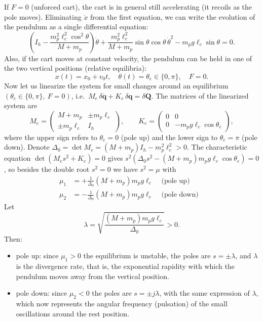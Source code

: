 \documentclass[10pt, a4paper]{report}
\begin{document}
If $F=0$ (unforced cart), the cart is in general still accelerating (it recoils as the pole moves). Eliminating $\ddot x$ from the first equation, we can write the evolution of the pendulum as a single differential equation:
\begin{equation}
    \left( I_h - \frac{m_p^2 \ell_c^2 \cos^2 \theta}{M + m_p} \right) \ddot{\theta} + \frac{m_p^2 \ell_c^2}{M + m_p} \sin \theta \cos \theta \, \dot{\theta}^2 - m_p g \ell_c \sin \theta = 0.
\end{equation}
Also, if the cart moves at constant velocity, the pendulum can be held in one of the two vertical positions (relative equilibria):
\begin{equation}
    x(t)=x_0+v_0t,\quad \theta(t)=\theta_e\in\{0,\pi\}, \quad F=0.
\end{equation}
Now let us linearize the system for small changes around an equilibrium $(\theta_e\in\{0,\pi\},\ F=0)$, i.e.\ $M_e\,\delta\ddot{\mathbf q}+K_e\,\delta\mathbf q=\delta\mathbf Q$. The matrices of the linearized system are
\begin{equation}
    M_e=\begin{pmatrix}
        M+m_p& \pm m_p\ell_c\\ \pm m_p\ell_c&I_h
    \end{pmatrix},\qquad K_e=\begin{pmatrix}
        0&0\\
        0&-m_pg\ell_c\cos\theta_e
    \end{pmatrix},
\end{equation}
where the upper sign refers to $\theta_e=0$ (pole up) and the lower sign to $\theta_e=\pi$ (pole down). Denote $\Delta_0=\det M_e=(M+m_p)I_h-m_p^2\ell_c^2>0$. The characteristic equation $\det(M_e s^2+K_e)=0$ gives $s^2\left(\Delta_0 s^2-(M+m_p)m_pg\ell_c\cos\theta_e\right)=0$, so besides the double root $s^2=0$ we have $s^2=\mu$ with
\begin{align}
    \mu_1&=+\frac{1}{\Delta_0}(M+m_p)m_pg\ell_c& \text{ (pole up)}&\\
    \mu_2&=-\frac{1}{\Delta_0}(M+m_p)m_pg\ell_c& \text{ (pole down)}&
\end{align}
Let
\begin{equation}
    \lambda = \sqrt{\frac{(M+m_p)m_pg\ell_c}{\Delta_0}}>0 .
\end{equation}
Then:
\begin{itemize}
    \item pole up: since $\mu_1>0$ the equilibrium is unstable, the poles are $s=\pm\lambda$, and $\lambda$ is the divergence rate, that is, the exponential rapidity with which the pendulum moves away from the vertical position.
    \item pole down: since $\mu_2<0$ the poles are $s=\pm j\lambda$, with the same expression of $\lambda$, which now represents the angular frequency (pulsation) of the small oscillations around the rest position.
\end{itemize}
\end{document}
